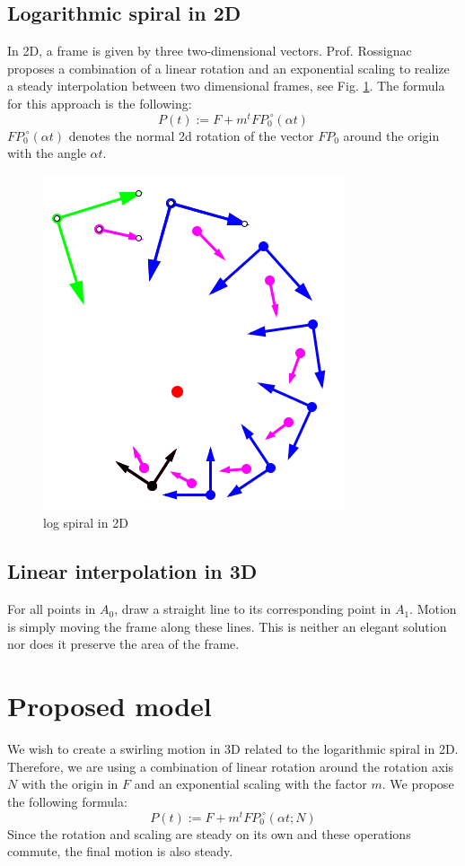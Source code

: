 \documentclass[journal, letterpaper]{IEEEtran}
\begin{document}
\subsection{Logarithmic spiral in 2D}
In 2D, a frame is given by three two-dimensional vectors. Prof. Rossignac proposes a combination of a linear rotation and an exponential scaling to realize a steady interpolation between two dimensional frames, see Fig. \ref{fig:P6}.
The formula for this approach is the following:
\begin{equation}
 P(t) := F + m^t FP_0 ^{\;\circ} (\alpha t)
\label{eq:logSpiral}
\end{equation}
$FP_0 ^{\;\circ} (\alpha t)$ denotes the normal 2d rotation of the vector $FP_0$ around the origin with the angle $\alpha t$.
\begin{figure}[H]
	\centering
		\includegraphics[scale=0.4]{pictures/P6.png}
	\caption{log spiral in 2D}
	\label{fig:P6}
\end{figure}

\subsection{Linear interpolation in 3D}
For all points in $A_0$, draw a straight line to its corresponding point in $A_1$. Motion is simply moving the frame along these lines.  This is neither an elegant solution nor does it preserve the area of the frame.

\section{Proposed model}
We wish to create a swirling motion in 3D related to the logarithmic spiral in 2D. Therefore, we are using a combination of linear rotation around the rotation axis $N$ with the origin in $F$ and an exponential scaling with the factor $m$. We propose the following formula:
\begin{equation}
 P(t) := F + m^t FP_0 ^{\;\circ} (\alpha t; N)
\label{eq:Interpolation}
\end{equation}
Since the rotation and scaling are steady on its own and these operations commute, the final motion is also steady.
\end{document}
